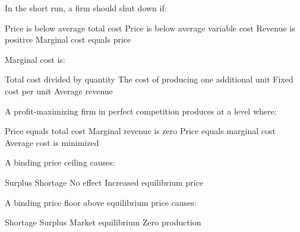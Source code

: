\documentclass[12pt]{exam}
\begin{document}
\begin{questions}
    \begin{mcquestion}[2]
        In the short run, a firm should shut down if:
        \begin{choices}
            \choice Price is below average total cost
            \CorrectChoice Price is below average variable cost
            \choice Revenue is positive
            \choice Marginal cost equals price
        \end{choices}
    \end{mcquestion}

    \begin{mcquestion}[2]
        Marginal cost is:
        \begin{choices}
            \choice Total cost divided by quantity
            \CorrectChoice The cost of producing one additional unit
            \choice Fixed cost per unit
            \choice Average revenue
        \end{choices}
    \end{mcquestion}

    \begin{mcquestion}[2]
        A profit-maximizing firm in perfect competition produces
        at a level where:
        \begin{choices}
            \choice Price equals total cost
            \choice Marginal revenue is zero
            \CorrectChoice Price equals marginal cost
            \choice Average cost is minimized
        \end{choices}
    \end{mcquestion}

    \begin{mcquestion}[2]
        A binding price ceiling causes:
        \begin{choices}
            \choice Surplus
            \CorrectChoice Shortage
            \choice No effect
            \choice Increased equilibrium price
        \end{choices}
    \end{mcquestion}

    \begin{mcquestion}[2]
        A binding price floor above equilibrium price causes:
        \begin{choices}
            \choice Shortage
            \CorrectChoice Surplus
            \choice Market equilibrium
            \choice Zero production
        \end{choices}
    \end{mcquestion}


\end{questions}
\end{document}
